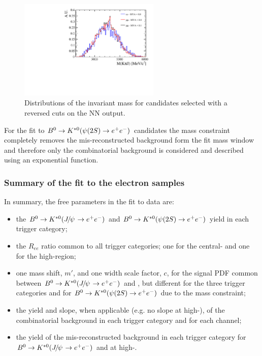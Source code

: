 \begin{figure}[t!]
\vspace{1cm}

\centering
\includegraphics[width=0.6\textwidth]{RKst/figs/Background/highq2_comb.pdf}
\caption{Distributions of the \mKpill invariant mass for \BdToKstll candidates selected with a reversed cuts on the NN output.}
\label{fig:highq2_comb}
\end{figure}

For the fit to $\Bd\to\Kstarz(\psitwos\to\ee)$ candidates the \psitwos mass constraint completely removes the mis-reconstructed 
background form the fit mass window and therefore only the combinatorial background is considered and described using an exponential function.


\subsubsection{Summary of the fit to the electron samples}

In summary, the free parameters in the fit to data are:
%
\begin{itemize}
\item the $\Bz\to\Kstarz(\jpsi\to\ee)$ and $\Bz\to\Kstarz(\psitwos\to\ee)$ yield in each trigger category;
\item the $R_{ee}$ ratio common to all trigger categories; one for the central- and one for the high-\qsq region;
\item one mass shift, $m'$, and one width scale factor, $c$, for the signal PDF common between $\Bd\to\Kstarz(\jpsi\to\ee)$ and \BdToKstee, but different for the three trigger categories and for $\Bd\to\Kstarz(\psitwos\to\ee)$ due to the \psitwos mass constraint;
\item the yield and slope, when applicable (e.g. no slope at high-\qsq), of the combinatorial background in each trigger category and for each channel;
\item the yield of the mis-reconstructed background in each trigger category for $\Bd\to\Kstarz(\jpsi\to\ee)$ and \BdToKstee at high-\qsq.
\end{itemize}

